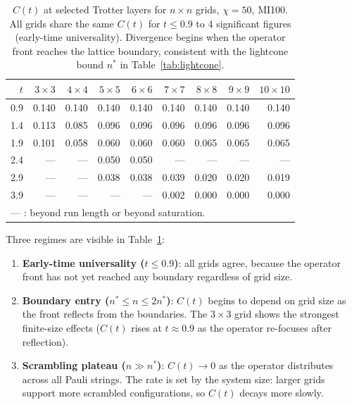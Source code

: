 \documentclass[11pt]{article}
\newcommand{\Ct}{C(t)}
\begin{document}
\begin{table}[ht]
\centering
\caption{$\Ct$ at selected Trotter layers for $n\times n$ grids, $\chi=50$, MI100.
  All grids share the same $\Ct$ for $t \leq 0.9$ to 4 significant figures
  (early-time universality).
  Divergence begins when the operator front reaches the lattice boundary,
  consistent with the lightcone bound $n^*$ in Table~\ref{tab:lightcone}.
}
\label{tab:ct_grids}
\begin{tabular}{r rrrrrrrr}
\toprule
$t$ & $3\times3$ & $4\times4$ & $5\times5$ & $6\times6$ & $7\times7$ & $8\times8$ & $9\times9$ & $10\times10$ \\
\midrule
0.9 & 0.140 & 0.140 & 0.140 & 0.140 & 0.140 & 0.140 & 0.140 & 0.140 \\
1.4 & 0.113 & 0.085 & 0.096 & 0.096 & 0.096 & 0.096 & 0.096 & 0.096 \\
1.9 & 0.101 & 0.058 & 0.060 & 0.060 & 0.060 & 0.065 & 0.065 & 0.065 \\
2.4 & ---   & ---   & 0.050 & 0.050 & ---   & ---   & ---   & ---   \\
2.9 & ---   & ---   & 0.038 & 0.038 & 0.039 & 0.020 & 0.020 & 0.019 \\
3.9 & ---   & ---   & ---   & ---   & 0.002 & 0.000 & 0.000 & 0.000 \\
\midrule
\multicolumn{9}{l}{--- : beyond run length or beyond saturation.}\\
\bottomrule
\end{tabular}
\end{table}

Three regimes are visible in Table~\ref{tab:ct_grids}:
\begin{enumerate}
  \item \textbf{Early-time universality ($t \leq 0.9$)}: all grids agree, because
        the operator front has not yet reached any boundary regardless of grid size.
  \item \textbf{Boundary entry ($n^* \leq n \leq 2n^*$)}: $\Ct$ begins to depend
        on grid size as the front reflects from the boundaries.
        The $3\times3$ grid shows the strongest finite-size effects ($\Ct$ rises
        at $t \approx 0.9$ as the operator re-focuses after reflection).
  \item \textbf{Scrambling plateau ($n \gg n^*$)}: $\Ct \to 0$ as the operator
        distributes across all Pauli strings.
        The rate is set by the system size: larger grids support more scrambled
        configurations, so $\Ct$ decays more slowly.
\end{enumerate}
\end{document}
